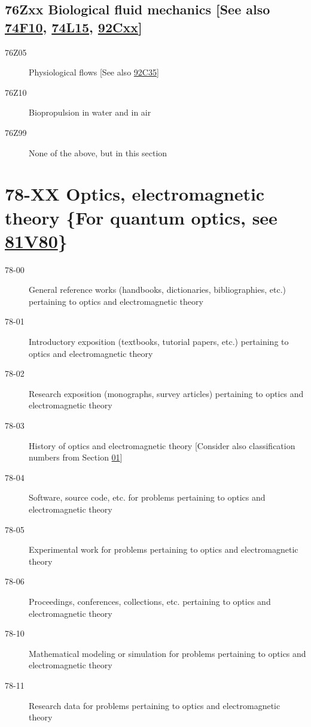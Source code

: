 \documentclass[letterpaper]{article}
\begin{document}
\subsection*{76Zxx  Biological fluid mechanics [See also \hyperref[74F10]{74F10}, \hyperref[74L15]{74L15}, \hyperref[92Cxx]{92Cxx}] }\label{76Zxx}
\begin{description}  
\item [76Z05]\label{76Z05} Physiological flows [See also \hyperref[92C35]{92C35}]
\item [76Z10]\label{76Z10} Biopropulsion in water and in air
\item [76Z99]\label{76Z99} None of the above, but in this section
\end{description}
\section*{78-XX Optics, electromagnetic theory \{For quantum optics, see \hyperref[81V80]{81V80}\} }\label{78-XX}
\begin{description}
\item [78-00]\label{78-00} General reference works (handbooks, dictionaries, bibliographies, etc.) pertaining to optics and electromagnetic theory
\item [78-01]\label{78-01} Introductory exposition (textbooks, tutorial papers, etc.) pertaining to optics and electromagnetic theory
\item [78-02]\label{78-02} Research exposition (monographs, survey articles) pertaining to optics and electromagnetic theory
\item [78-03]\label{78-03} History of optics and electromagnetic theory [Consider also classification numbers from Section \hyperref[01-XX]{01}]
\item [78-04]\label{78-04} Software, source code, etc. for problems pertaining to optics and electromagnetic theory
\item [78-05]\label{78-05} Experimental work for problems pertaining to optics and electromagnetic theory
\item [78-06]\label{78-06} Proceedings, conferences, collections, etc. pertaining to optics and electromagnetic theory
\item [78-10]\label{78-10} Mathematical modeling or simulation for problems pertaining to optics and electromagnetic theory
\item [78-11]\label{78-11} Research data for problems pertaining to optics and electromagnetic theory
\end{description}
\end{document}
